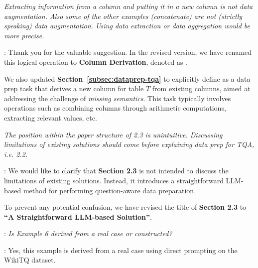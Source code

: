 \begin{shaded}
{
%
\emph{Extracting information from a column and putting it in a new column is not data augmentation. Also some of the other examples (concatenate) are not (strictly speaking) data augmentation. Using data extraction or data aggregation would be more precise.}
%
}
\end{shaded}
: 
Thank you for the valuable suggestion.
In the revised version, we have renamed this logical operation to \textbf{Column Derivation}, denoted as .

We also updated \textbf{Section~\ref{subsec:dataprep-tqa}} to explicitly define  as a data prep task that derives a new column for table $T$ from existing columns, aimed at addressing the challenge of \emph{missing semantics}. This task typically involves operations such as combining columns through arithmetic computations, extracting relevant values, etc.



\begin{shaded}
{
\emph{The position within the paper structure of 2.3 is unintuitive. Discussing limitations of existing solutions should come before explaining data prep for TQA, i.e. 2.2.
}
}
\end{shaded}

: 
We would like to clarify that \textbf{Section 2.3} is not intended to discuss the limitations of existing solutions. Instead, it introduces a straightforward LLM-based method for performing question-aware data preparation.

To prevent any potential confusion, we have revised the title of \textbf{Section 2.3} to \textbf{``A Straightforward LLM-based Solution''}.


\begin{shaded}
{

: 
\emph{Is Example 6 derived from a real case or constructed?
}
}
\end{shaded}
: 
Yes, this example is derived from a real case using direct prompting on the WikiTQ dataset. 


